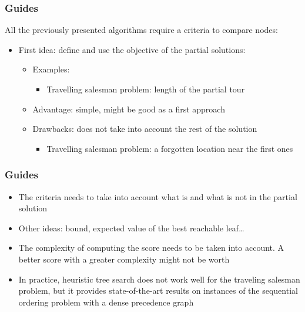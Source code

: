 \documentclass[10pt]{beamer}
\begin{document}
\begin{frame}
  \frametitle{Guides}

  All the previously presented algorithms require a criteria to compare nodes:
  \begin{itemize}
    \item First idea: define and use the objective of the partial solutions:
      \begin{itemize}
        \item Examples:
          \begin{itemize}
            \item Travelling salesman problem: length of the partial tour
          \end{itemize}
        \item Advantage: simple, might be good as a first approach
        \item Drawbacks: does not take into account the rest of the solution
          \begin{itemize}
            \item Travelling salesman problem: a forgotten location near the first ones
          \end{itemize}
      \end{itemize}
  \end{itemize}

  \pause
  \centering
  \def\svgwidth{0.4\columnwidth}
  
\end{frame}

\begin{frame}
  \frametitle{Guides}

  \begin{itemize}
    \item The criteria needs to take into account what is and what is not in the partial solution
    \item Other ideas: bound, expected value of the best reachable leaf\dots
    \item The complexity of computing the score needs to be taken into account. A better score with a greater complexity might not be worth
    \item In practice, heuristic tree search does not work well for the traveling salesman problem, but it provides state-of-the-art results on instances of the sequential ordering problem with a dense precedence graph
  \end{itemize}
\end{frame}
\end{document}
